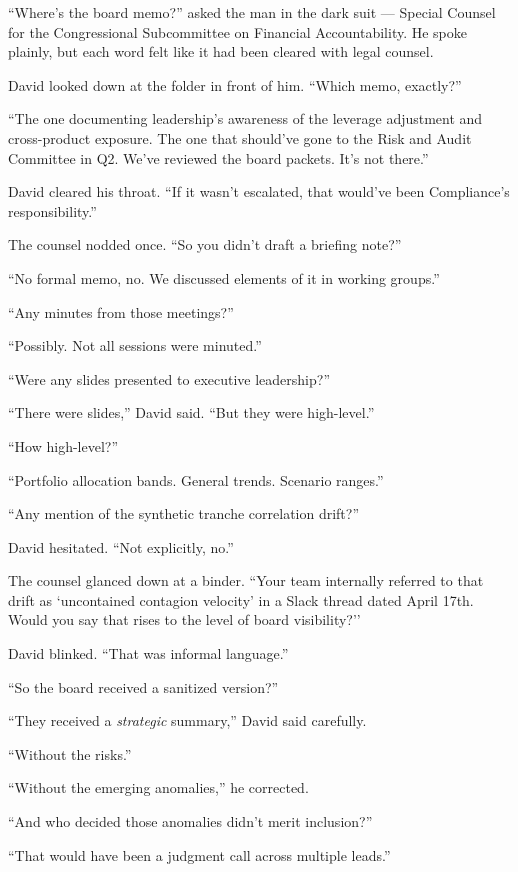 ``Where’s the board memo?'' asked the man in the dark suit — Special Counsel for the Congressional Subcommittee 
on Financial Accountability. He spoke plainly, but each word felt like it had been cleared with legal counsel.

David looked down at the folder in front of him. ``Which memo, exactly?''

``The one documenting leadership’s awareness of the leverage adjustment and cross-product exposure. The one that 
should’ve gone to the Risk and Audit Committee in Q2. We’ve reviewed the board packets. It’s not there.''

David cleared his throat. ``If it wasn’t escalated, that would’ve been Compliance’s responsibility.''

The counsel nodded once. ``So you didn’t draft a briefing note?''

``No formal memo, no. We discussed elements of it in working groups.''

``Any minutes from those meetings?''

``Possibly. Not all sessions were minuted.''

``Were any slides presented to executive leadership?''

``There were slides,'' David said. ``But they were high-level.''

``How high-level?''

``Portfolio allocation bands. General trends. Scenario ranges.''

``Any mention of the synthetic tranche correlation drift?''

David hesitated. ``Not explicitly, no.''

The counsel glanced down at a binder. ``Your team internally referred to that drift as `uncontained contagion 
velocity’ in a Slack thread dated April 17th. Would you say that rises to the level of board visibility?''

David blinked. ``That was informal language.''

``So the board received a sanitized version?''

``They received a \textit{strategic} summary,'' David said carefully.

``Without the risks.''

``Without the emerging anomalies,'' he corrected.

``And who decided those anomalies didn’t merit inclusion?''

``That would have been a judgment call across multiple leads.''

